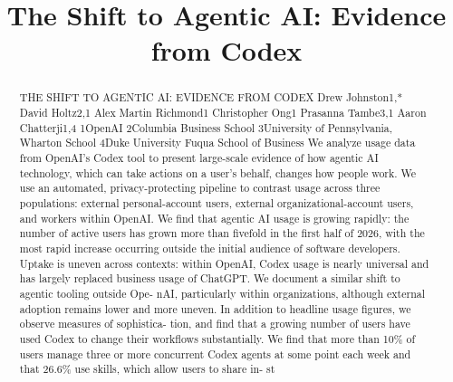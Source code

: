 \title{The Shift to Agentic AI: Evidence from Codex}

\maketitle

\begin{abstract}
THE SHIFT TO AGENTIC AI: EVIDENCE FROM CODEX Drew Johnston1,* David Holtz2,1 Alex Martin Richmond1 Christopher Ong1 Prasanna Tambe3,1 Aaron Chatterji1,4 1OpenAI 2Columbia Business School 3University of Pennsylvania, Wharton School 4Duke University Fuqua School of Business We analyze usage data from OpenAI’s Codex tool to present large-scale evidence of how agentic AI technology, which can take actions on a user’s behalf, changes how people work. We use an automated, privacy-protecting pipeline to contrast usage across three populations: external personal-account users, external organizational-account users, and workers within OpenAI. We find that agentic AI usage is growing rapidly: the number of active users has grown more than fivefold in the first half of 2026, with the most rapid increase occurring outside the initial audience of software developers. Uptake is uneven across contexts: within OpenAI, Codex usage is nearly universal and has largely replaced business usage of ChatGPT. We document a similar shift to agentic tooling outside Ope- nAI, particularly within organizations, although external adoption remains lower and more uneven. In addition to headline usage figures, we observe measures of sophistica- tion, and find that a growing number of users have used Codex to change their workflows substantially. We find that more than 10\% of users manage three or more concurrent Codex agents at some point each week and that 26.6\% use skills, which allow users to share in- st
\end{abstract}

